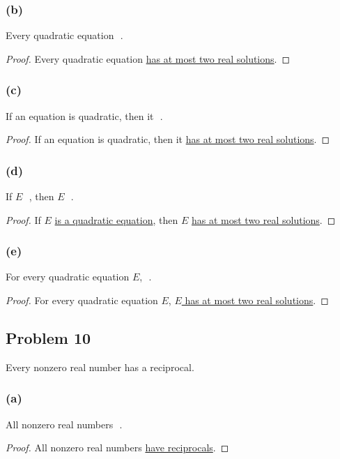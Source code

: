 \documentclass[14pt]{extarticle}
\newcommand{\fbl}{\underline{\hspace{1cm}}\,\,}
\begin{document}
\subsubsection{(b)}
Every quadratic equation \fbl.

\begin{proof}
    Every quadratic equation \underline{has at most two real solutions}.
\end{proof}

\subsubsection{(c)}
If an equation is quadratic, then it \fbl.

\begin{proof}
    If an equation is quadratic, then it \underline{has at most two real solutions}.
\end{proof}

\subsubsection{(d)}
If $E$ \fbl, then $E$ \fbl.

\begin{proof}
    If $E$ \underline{is a quadratic equation}, then $E$ \underline{has at most two
        real solutions}.
\end{proof}

\subsubsection{(e)}
For every quadratic equation $E$, \fbl.

\begin{proof}
    For every quadratic equation $E$, \underline{$E$ has at most two real
        solutions}.
\end{proof}

\subsection{Problem 10}
Every nonzero real number has a reciprocal.

\subsubsection{(a)}
All nonzero real numbers \fbl.

\begin{proof}
    All nonzero real numbers \underline{have reciprocals}.
\end{proof}
\end{document}
